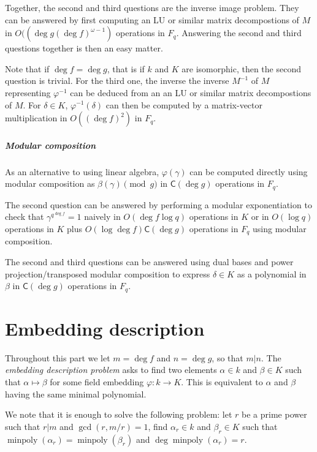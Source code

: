 \documentclass[12pt]{article}
\theoremstyle{plain}
\theoremstyle{definition}
\DeclareMathOperator{\minpoly}{minpoly}
\def\MC{\ensuremath{\mathsf{C}}}
\begin{document}
Together, the second and third questions are the inverse image problem.
They can be answered by first computing 
an LU or similar matrix decompostions of $M$
in $O((\deg g (\deg f)^{\omega - 1})$ operations in $F_q$.
Answering the second and third questions together is then
an easy matter.

Note that if $\deg f = \deg g$, that is if $k$ and $K$ are
isomorphic, then the second question is trivial.
For the third one, the inverse 
the inverse $M^{-1}$ of $M$ representing $\varphi^{-1}$
can be deduced from an an LU or similar matrix decompostions of $M$.
For $\delta \in K$, $\varphi^{-1}(\delta)$ can then be computed by a
matrix-vector multiplication in $O((\deg f)^2)$ in $F_q$.

\subsubsection{Modular composition}

As an alternative to using linear algebra,
$\varphi(\gamma)$ can be computed directly using modular composition
as $\beta(\gamma) \pmod{g}$ in $\MC(\deg g)$ operations in $F_q$.

The second question can be answered by performing a modular
exponentiation to check that $\gamma^{q^{\deg f}} = 1$
naively in $O(\deg f \log q)$ operations in $K$
or in $O(\log q)$ operations in $K$ plus
$O(\log \deg f) \MC(\deg g)$ operations in $F_q$ using modular composition.

The second and third questions can be answered using
dual bases and power projection/transposed modular composition
to express $\delta \in K$ as a polynomial in $\beta$ in
$\MC(\deg g)$ operations in $F_q$.


\part{Embedding description}

Throughout this part we let $m=\deg f$ and $n=\deg g$, so that
$m|n$. The \emph{embedding description problem} asks to find two
elements $\alpha\in k$ and $\beta\in K$ such that $\alpha\mapsto\beta$
for some field embedding $\varphi:k\to K$. This is equivalent to
$\alpha$ and $\beta$ having the same minimal polynomial.

We note that it is enough to solve the following problem: let $r$ be a
prime power such that $r|m$ and $\gcd(r,m/r)=1$, find $\alpha_r\in k$
and $\beta_r\in K$ such that $\minpoly(\alpha_r)=\minpoly(\beta_r)$
and $\deg\minpoly(\alpha_r)=r$.
\end{document}
